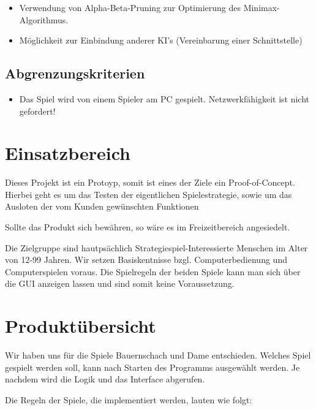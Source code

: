 \documentclass[14pt]{scrartcl}
\begin{document}
\begin{itemize}
    \item Verwendung von Alpha-Beta-Pruning zur Optimierung des Minimax-Algorithmus.
    \item Möglichkeit zur Einbindung anderer KI’s (Vereinbarung einer Schnittstelle)
\end{itemize}


\subsection{Abgrenzungskriterien}

\begin{itemize}
    \item Das Spiel wird von einem Spieler am PC gespielt. Netzwerkfähigkeit ist nicht gefordert!
\end{itemize}


\newpage
\section{Einsatzbereich}

Dieses Projekt ist ein Protoyp, somit ist eines der Ziele ein Proof-of-Concept. Hierbei geht es um das Testen der 
eigentlichen Spielestrategie, sowie um das Ausloten der vom Kunden gewünschten Funktionen \par

Sollte das Produkt sich bewähren, so wäre es im Freizeitbereich angesiedelt. \par

Die Zielgruppe sind hautpsächlich Strategiespiel-Interessierte Menschen im Alter von 12-99 Jahren. Wir setzen Basiskentnisse
bzgl. Computerbedienung und Computerspielen voraus. Die Spielregeln der beiden Spiele kann man sich über die GUI anzeigen lassen und sind somit
keine Voraussetzung.\par


\section{Produktübersicht}

Wir haben uns für die Spiele Bauernschach und Dame entschieden. Welches Spiel gespielt werden soll, kann nach Starten des Programms ausgewählt werden. Je nachdem wird die Logik und das Interface abgerufen. \par 

Die Regeln der Spiele, die implementiert werden, lauten wie folgt: \newline
\end{document}

